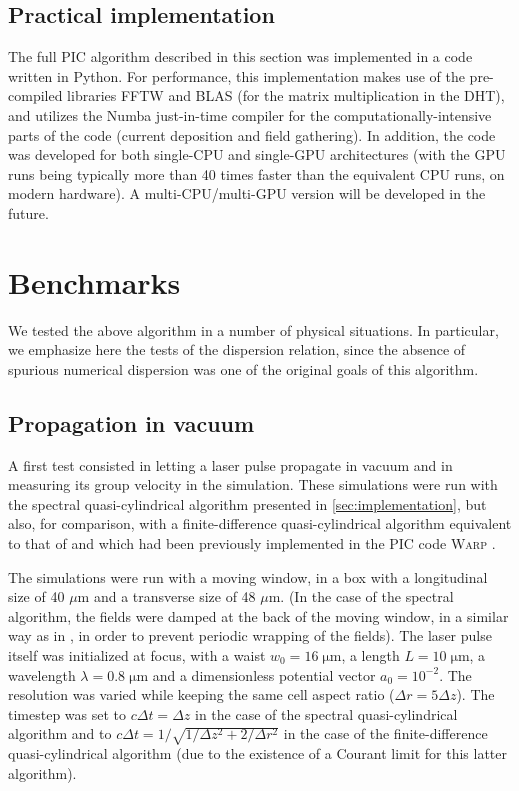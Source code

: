 \documentclass[1p,times,authoryear]{elsarticle}
\begin{document}
\subsection{Practical implementation}

The full PIC algorithm described in this section was implemented in a
code written in Python. For performance, this implementation makes use of the
pre-compiled libraries FFTW and BLAS (for the matrix multiplication
  in the DHT), and utilizes the Numba just-in-time compiler for the
  computationally-intensive parts of the code (current deposition and
  field gathering). In addition, the code
  was developed for both single-CPU and single-GPU architectures (with the GPU runs
  being typically more than 40 times faster than the equivalent CPU runs, on
  modern hardware). A multi-CPU/multi-GPU version will be developed in
  the future.

\section{Benchmarks}
\label{sec:benchmarks}

We tested the above algorithm in a number of physical situations. In
particular, we emphasize here the tests of the dispersion relation, since the absence of
spurious numerical dispersion was one of the original goals of this algorithm.

\subsection{Propagation in vacuum}
\label{sec:vacuum_vg}

A first test consisted in letting a laser pulse propagate in vacuum and in
measuring its group velocity in the simulation. These simulations were
run with the spectral quasi-cylindrical algorithm presented in
\cref{sec:implementation}, but also, for comparison, with a finite-difference quasi-cylindrical
algorithm equivalent to that of \cite{Lifschitz,Davidson} and which had
been previously implemented in the PIC code \textsc{Warp} \citep{Warpref}.

The simulations were run with a moving window, in a box with a
longitudinal size of 40 $\mu$m and a transverse size of 48 $\mu$m. (In
the case of the spectral algorithm, the fields were damped at the back
of the moving window, in a similar way as in \citep{YuIPAC2015}, in
order to prevent periodic wrapping of the fields).
The laser pulse itself was initialized at focus, with a waist 
$w_0 = 16 \;\mathrm{\mu m}$, a length $L = 10 \; \mathrm{\mu m}$,
a wavelength $\lambda = 0.8 \; \mathrm{\mu m}$ and a 
dimensionless potential vector $a_0 = 10^{-2}$.
The resolution was varied while keeping the same cell aspect ratio ($\Delta r = 5\Delta z$). The
timestep was set to $c\Delta t = \Delta z$ in the case of the spectral
quasi-cylindrical algorithm and to $c\Delta t = 1/\sqrt{1/\Delta z^2 +
  2/\Delta r^2}$ in the case of the finite-difference
quasi-cylindrical algorithm (due to the existence of a Courant
limit for this latter algorithm). 
\end{document}
